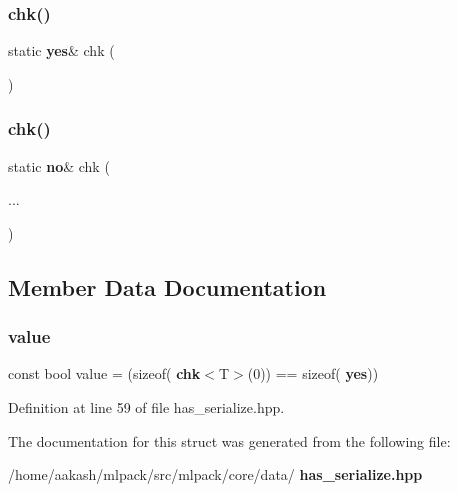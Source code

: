 \subsubsection{chk()\hspace{0.1cm}{\footnotesize\ttfamily [1/2]}}
{\footnotesize\ttfamily static \textbf{ yes}\& chk (\begin{DoxyParamCaption}\item[{\textbf{ check}$<$ U, typename \textbf{ std\+::enable\+\_\+if\+\_\+t}$<$ std\+::is\+\_\+class$<$ U $>$\+::\textbf{ value} $>$ $\ast$, typename \textbf{ std\+::enable\+\_\+if\+\_\+t}$<$ \textbf{ Has\+Serialize\+Function}$<$ U $>$\+::\textbf{ value} $>$ $\ast$$>$ $\ast$}]{ }\end{DoxyParamCaption})\hspace{0.3cm}{\ttfamily [static]}}

\mbox{\label{structmlpack_1_1data_1_1HasSerialize_a0f08a85124143fdc0b47ebd46d3b8ae0}} 
\subsubsection{chk()\hspace{0.1cm}{\footnotesize\ttfamily [2/2]}}
{\footnotesize\ttfamily static \textbf{ no}\& chk (\begin{DoxyParamCaption}\item[{}]{... }\end{DoxyParamCaption})\hspace{0.3cm}{\ttfamily [static]}}



\subsection{Member Data Documentation}
\mbox{\label{structmlpack_1_1data_1_1HasSerialize_a11ddd051208250c32dc4985abcafa86d}} 
\subsubsection{value}
{\footnotesize\ttfamily const bool value = (sizeof(\textbf{ chk}$<$T$>$(0)) == sizeof(\textbf{ yes}))\hspace{0.3cm}{\ttfamily [static]}}



Definition at line 59 of file has\+\_\+serialize.\+hpp.



The documentation for this struct was generated from the following file\+:\begin{DoxyCompactItemize}
\item 
/home/aakash/mlpack/src/mlpack/core/data/\textbf{ has\+\_\+serialize.\+hpp}\end{DoxyCompactItemize}
